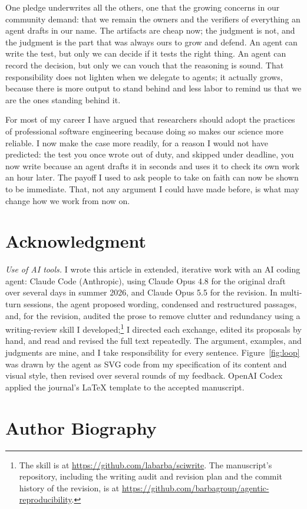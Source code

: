 \documentclass{IEEEcsmag}
\begin{document}
One pledge underwrites all the others, one that the growing concerns in our community demand: that we remain the owners and the verifiers of everything an agent drafts in our name. The artifacts are cheap now; the judgment is not, and the judgment is the part that was always ours to grow and defend. An agent can write the test, but only we can decide if it tests the right thing. An agent can record the decision, but only we can vouch that the reasoning is sound. That responsibility does not lighten when we delegate to agents; it actually grows, because there is more output to stand behind and less labor to remind us that we are the ones standing behind it.

For most of my career I have argued that researchers should adopt the practices of professional software engineering because doing so makes our science more reliable. I now make the case more readily, for a reason I would not have predicted: the test you once wrote out of duty, and skipped under deadline, you now write because an agent drafts it in seconds and uses it to check its own work an hour later. The payoff I used to ask people to take on faith can now be shown to be immediate. That, not any argument I could have made before, is what may change how we work from now on.

\section*{Acknowledgment}
\textit{Use of AI tools.} I wrote this article in extended, iterative work with an AI coding agent: Claude Code (Anthropic), using Claude Opus 4.8 for the original draft over several days in summer 2026, and Claude Opus 5.5 for the revision. In multi-turn sessions, the agent proposed wording, condensed and restructured passages, and, for the revision, audited the prose to remove clutter and redundancy using a writing-review skill I developed;\footnote{The skill is at \url{https://github.com/labarba/sciwrite}. The manuscript's repository, including the writing audit and revision plan and the commit history of the revision, is at \url{https://github.com/barbagroup/agentic-reproducibility}.} I directed each exchange, edited its proposals by hand, and read and revised the full text repeatedly. The argument, examples, and judgments are mine, and I take responsibility for every sentence. Figure~\ref{fig:loop} was drawn by the agent as SVG code from my specification of its content and visual style, then revised over several rounds of my feedback. OpenAI Codex applied the journal's LaTeX template to the accepted manuscript.



\par\bigskip\noindent\begin{minipage}{\columnwidth}
\section*{Author Biography}

\end{minipage}
\end{document}
